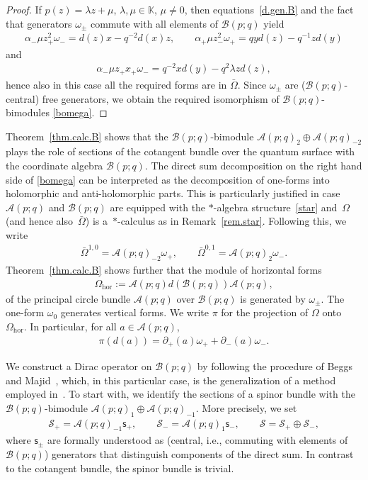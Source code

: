 \documentclass[10pt,a4paper]{amsart}
\numberwithin{equation}{section}
\def\Weyl#1#2{{\mathcal{B}}(#1;#2)}
\def\AWeyl#1#2{{\mathcal{A}}(#1;#2)}
\begin{document}
\begin{proof}
If $p(z) = \lambda z +\mu$, $\lambda, \mu\in {\mathbb K}$, $\mu\neq 0$, then equations~\eqref{d.gen.B} and the fact that generators $\omega_\pm$ commute with all elements of $\Weyl p q$ yield
\begin{gather*}
\alpha_-\mu z_+^2\omega_- = d(z) x - q^{-2}d(x)z, \qquad \alpha_+\mu z_-^2\omega_+ = qyd(z) - q^{-1}z d(y)
\end{gather*}
and
\begin{gather*}
\alpha_-\mu z_+x_+\omega_- = q^{-2}x d(y) - q^2 \lambda z d(z),
\end{gather*}
hence also in this case all the required forms are in $\bar{\Omega}$.
Since $\omega_\pm$ are ($\Weyl p q$-central) free generators, we obtain the required isomorphism of $\Weyl p q$-bimodules \eqref{bomega}.
\end{proof}


Theorem~\ref{thm.calc.B} shows that the $\Weyl p q$-bimodule $\AWeyl p q_{2} \oplus \AWeyl p q_{-2}$ plays the role of sections of the cotangent bundle over the quantum surface with the coordinate algebra $\Weyl p q$. The direct sum decomposition on the right hand side of \eqref{bomega} can be interpreted as the decomposition of one-forms into holomorphic and anti-holomorphic parts. This is particularly justif\/ied in case~$\AWeyl p q$ and $\Weyl p q$ are equipped with the $*$-algebra structure~\eqref{star} and~$\Omega$ (and hence also~$\bar\Omega$) is a~$*$-calculus as in Remark~\ref{rem.star}. Following this, we write
\begin{gather*}
\bar\Omega^{1,0} = \AWeyl p q _{-2} \omega_+, \qquad \bar\Omega^{0,1} = \AWeyl p q _{2} \omega_-.
\end{gather*}
Theorem~\ref{thm.calc.B} shows further that the module of horizontal forms
\begin{gather*}
\Omega_{\mathrm{hor}} := \AWeyl p q d (\Weyl p q ) \AWeyl p q,
\end{gather*}
of the principal circle bundle $\AWeyl p q$ over $\Weyl p q$ is generated by $\omega_\pm$. The one-form $\omega_0$ generates vertical forms. We write $\pi$ for the projection of $\Omega$ onto $\Omega_{\mathrm{hor}}$. In particular, for all $a\in \AWeyl p q$,
\begin{gather*}%
\pi(d(a)) = \partial_+(a)\omega_+ + \partial_-(a)\omega_-.
\end{gather*}

We construct a Dirac operator on $\Weyl p q$ by following the procedure of Beggs and Majid~\cite{BegMaj:spe}, which, in this particular case, is the generalization of a method employed in~\cite{Maj:Rie}. To start with, we identify the sections of a spinor bundle with the $\Weyl p q$-bimodule
$\AWeyl p q_{1} \oplus \AWeyl p q_{-1}$. More precisely, we set
\begin{gather}\label{spinor}
\mathcal{S}_+ = \AWeyl p q_{-1}{\mathsf{s}}_+, \qquad \mathcal{S}_- = \AWeyl p q_{1}{\mathsf{s}}_-, \qquad \mathcal{S} = \mathcal{S}_+\oplus \mathcal{S}_-,
\end{gather}
where ${\mathsf{s}}_\pm$ are formally understood as (central, i.e., commuting with elements of $\Weyl p q$) generators that distinguish components of the direct sum. In contrast to the cotangent bundle, the spinor bundle is trivial.
\end{document}
